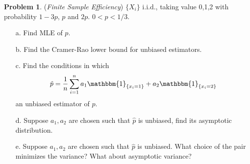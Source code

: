 \documentclass[a4paper, 10pt]{article}
\theoremstyle{definition}
\newtheorem{problem}{Problem}
\theoremstyle{hSol}
\begin{document}
\begin{problem} (\textit{Finite Sample Efficiency}) $\{X_i\}$ i.i.d., taking value 0,1,2 with probability $1-3p$, $p$ and $2p$. $0<p<1/3$.
\begin{itemize}
  \item[a.] Find MLE of $p$.
  \item[b.] Find the Cramer-Rao lower bound for unbiased estimators.
  \item[c.] Find the conditions in which
  $$
  \hat{p} = \frac{1}{n}\sum_{i=1}^n a_1 \mathbbm{1}_{\{x_i=1\}} + a_2 \mathbbm{1}_{\{x_i=2\}}
  $$
  an unbiased estimator of $p$.
  \item[d.] Suppose $a_1, a_2$ are chosen such that $\hat{p}$ is unbiased, find its asymptotic distribution.
  \item[e.] Suppose $a_1, a_2$ are chosen such that $\hat{p}$ is unbiased. What choice of the pair minimizes the variance? What about asymptotic variance?
\end{itemize}
\end{problem}
\end{document}
